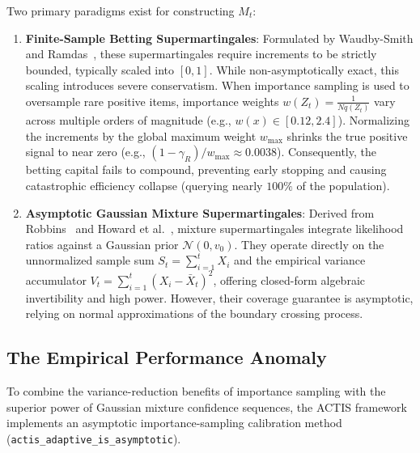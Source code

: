 \documentclass[11pt,a4paper]{article}
\begin{document}
Two primary paradigms exist for constructing $M_t$:
\begin{enumerate}[leftmargin=*]
    \item \textbf{Finite-Sample Betting Supermartingales}: Formulated by Waudby-Smith and Ramdas~\cite{waudby2024}, these supermartingales require increments to be strictly bounded, typically scaled into $[0, 1]$. While non-asymptotically exact, this scaling introduces severe conservatism. When importance sampling is used to oversample rare positive items, importance weights $w(Z_t) = \frac{1}{N q(Z_t)}$ vary across multiple orders of magnitude (e.g., $w(x) \in [0.12, 2.4]$). Normalizing the increments by the global maximum weight $w_{\max}$ shrinks the true positive signal to near zero (e.g., $(1 - \gamma_R) / w_{\max} \approx 0.0038$). Consequently, the betting capital fails to compound, preventing early stopping and causing catastrophic efficiency collapse (querying nearly $100\%$ of the population).
    \item \textbf{Asymptotic Gaussian Mixture Supermartingales}: Derived from Robbins~\cite{robbins1970} and Howard et al.~\cite{howard2021}, mixture supermartingales integrate likelihood ratios against a Gaussian prior $\mathcal{N}(0, v_0)$. They operate directly on the unnormalized sample sum $S_t = \sum_{i=1}^t X_i$ and the empirical variance accumulator $V_t = \sum_{i=1}^t (X_i - \bar{X}_t)^2$, offering closed-form algebraic invertibility and high power. However, their coverage guarantee is asymptotic, relying on normal approximations of the boundary crossing process.
\end{enumerate}

\subsection{The Empirical Performance Anomaly}
To combine the variance-reduction benefits of importance sampling with the superior power of Gaussian mixture confidence sequences, the ACTIS framework implements an asymptotic importance-sampling calibration method (\texttt{actis\_adaptive\_is\_asymptotic}). 
\end{document}
